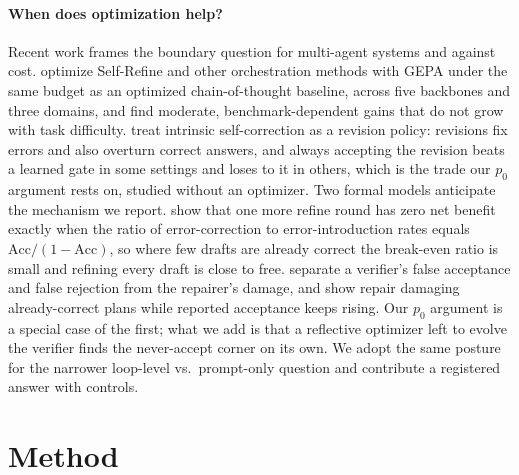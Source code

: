 \documentclass[11pt]{article}
\begin{document}
\paragraph{When does optimization help?}
Recent work frames the boundary question for multi-agent systems \citep{bai2026masprompt} and
against cost. \citet{leins2026orchestration} optimize Self-Refine and other orchestration methods
with GEPA under the same budget as an optimized chain-of-thought baseline, across five backbones
and three domains, and find moderate, benchmark-dependent gains that do not grow with task
difficulty. \citet{zhang2026revisions} treat intrinsic self-correction as a revision policy:
revisions fix errors and also overturn correct answers, and always accepting the revision beats a
learned gate in some settings and loses to it in others, which is the trade our $p_0$ argument
rests on, studied without an optimizer. Two formal models anticipate the mechanism we report.
\citet{liu2026feedbackcontrol} show that one more refine round has zero net benefit exactly when
the ratio of error-correction to error-introduction rates equals $\mathrm{Acc}/(1-\mathrm{Acc})$, so
where few drafts are already correct the break-even ratio is small and refining every draft is
close to free. \citet{wu2026vrrstop} separate a verifier's false acceptance and false rejection from
the repairer's damage, and show repair damaging already-correct plans while reported acceptance
keeps rising. Our $p_0$ argument is a special case of the first; what we add is that a reflective
optimizer left to evolve the verifier finds the never-accept corner on its own. We adopt the same posture for the narrower loop-level
vs.\ prompt-only question and contribute a registered answer with controls.

\section{Method}
\label{sec:method}


\end{document}
